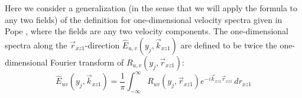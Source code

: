 \documentclass[letterpaper,11pt,nointlimits,reqno]{amsart}
\begin{document}
Here we consider a generalization (in the sense that we will apply the formula
to any two fields) of the definition for one-dimensional velocity spectra given
in Pope \citep[\textsection{}6.3]{Pope2000Turbulent}, where the fields are any
two velocity components.  The one-dimensional spectra along the
$\vec{r}_{xz1}$-direction  $\hat{E}_{u,v}(y_j,\vec{k}_{xz1})$ are defined to be twice
the one-dimensional Fourier transform of $R_{u,v}(y_j,\vec{r}_{xz1})$:
%
\begin{equation}
\hat{E}_{uv}(y_j,\vec{k}_{xz1}) = \frac{1}{\pi} \int_{-\infty}^{\infty}
                           R_{uv}(y_j,\vec{r}_{xz1})
                           e^{-i \vec{k}_{xz1} \vec{r}_{xz1}} \,d\!r_{xz1}
\end{equation}
%

\newcommand*{\doi}[1]{\href{http://dx.doi.org/\detokenize{#1}}{doi: #1}}


\end{document}
